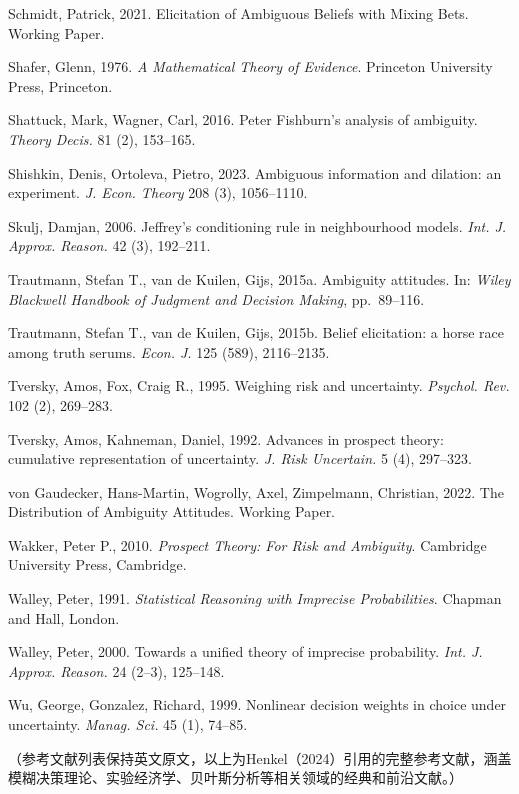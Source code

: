 \documentclass[12pt,a4paper]{article}
\newenvironment{original}
  {\par\medskip\noindent\color{black}\ignorespaces}
  {\par\medskip}
\newenvironment{translation}
  {\par\noindent\color{transblue}\ignorespaces}
  {\par\medskip\medskip}
\begin{document}
\begin{original}
\noindent Schmidt, Patrick, 2021. Elicitation of Ambiguous Beliefs with Mixing Bets. Working Paper.

\noindent Shafer, Glenn, 1976. \textit{A Mathematical Theory of Evidence}. Princeton University Press, Princeton.

\noindent Shattuck, Mark, Wagner, Carl, 2016. Peter Fishburn's analysis of ambiguity. \textit{Theory Decis.} 81 (2), 153--165.

\noindent Shishkin, Denis, Ortoleva, Pietro, 2023. Ambiguous information and dilation: an experiment. \textit{J. Econ. Theory} 208 (3), 1056--1110.

\noindent Skulj, Damjan, 2006. Jeffrey's conditioning rule in neighbourhood models. \textit{Int. J. Approx. Reason.} 42 (3), 192--211.

\noindent Trautmann, Stefan T., van de Kuilen, Gijs, 2015a. Ambiguity attitudes. In: \textit{Wiley Blackwell Handbook of Judgment and Decision Making}, pp.\ 89--116.

\noindent Trautmann, Stefan T., van de Kuilen, Gijs, 2015b. Belief elicitation: a horse race among truth serums. \textit{Econ. J.} 125 (589), 2116--2135.

\noindent Tversky, Amos, Fox, Craig R., 1995. Weighing risk and uncertainty. \textit{Psychol. Rev.} 102 (2), 269--283.

\noindent Tversky, Amos, Kahneman, Daniel, 1992. Advances in prospect theory: cumulative representation of uncertainty. \textit{J. Risk Uncertain.} 5 (4), 297--323.

\noindent von Gaudecker, Hans-Martin, Wogrolly, Axel, Zimpelmann, Christian, 2022. The Distribution of Ambiguity Attitudes. Working Paper.

\noindent Wakker, Peter P., 2010. \textit{Prospect Theory: For Risk and Ambiguity}. Cambridge University Press, Cambridge.

\noindent Walley, Peter, 1991. \textit{Statistical Reasoning with Imprecise Probabilities}. Chapman and Hall, London.

\noindent Walley, Peter, 2000. Towards a unified theory of imprecise probability. \textit{Int. J. Approx. Reason.} 24 (2--3), 125--148.

\noindent Wu, George, Gonzalez, Richard, 1999. Nonlinear decision weights in choice under uncertainty. \textit{Manag. Sci.} 45 (1), 74--85.
\end{original}

\begin{translation}
\small
（参考文献列表保持英文原文，以上为Henkel（2024）引用的完整参考文献，涵盖模糊决策理论、实验经济学、贝叶斯分析等相关领域的经典和前沿文献。）
\end{translation}
\end{document}
